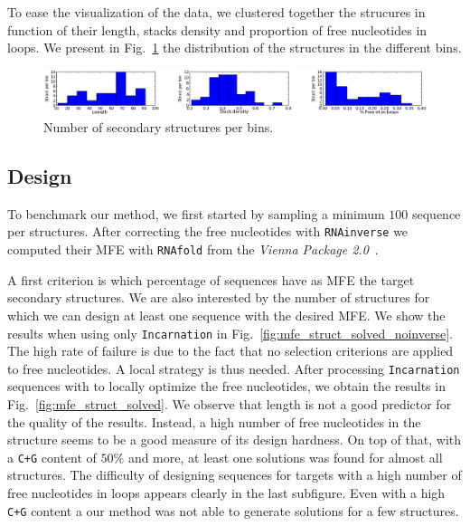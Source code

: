  To ease the visualization of the data, we clustered together the strucures
 in function of their length, stacks density and proportion of free 
 nucleotides in loops. We present in Fig.~\ref{fig:bins} the distribution
 of the structures in the different bins.
 
 \begin{figure}[ht!]
 	\centering
	\includegraphics[width=\textwidth]{Figures/bins_distribution.png}
	\caption{Number of secondary structures per bins.}
	\label{fig:bins}
 \end{figure}
 
 
\subsection{Design}
 To benchmark our method, we first started by sampling a minimum
 $100$ sequence per structures. After correcting the free nucleotides with
 \texttt{RNAinverse} we computed their MFE with \texttt{RNAfold} from the \textit{Vienna Package 2.0}~\cite{Hofacker:1994}.
 
A first criterion is which percentage of sequences have as MFE the target
secondary structures. We are also interested by the number of structures
for which we can design at least one sequence with the desired MFE.
We show the results when using only \texttt{Incarnation} in 
 Fig.~\ref{fig:mfe_struct_solved_noinverse}. The high rate of failure
is due to the fact that no selection criterions are applied to
free nucleotides. A local strategy is thus needed.
After processing \texttt{Incarnation} sequences with \RNAinverse to 
locally optimize the free nucleotides, we obtain the results 
in Fig.~\ref{fig:mfe_struct_solved}. We observe
that length is not a good predictor for the quality of the results. Instead,
a high number of free nucleotides in the structure seems to be a 
good measure of its design hardness. 
On top of that, with a \texttt{C+G} content of $50\%$ and more, at least
one solutions was found for almost all structures. The difficulty of 
designing sequences for targets with a high number of free nucleotides 
 in loops appears clearly in the last subfigure. Even with a high \texttt{C+G} content a our method was not able to generate solutions for a few
 structures. 

